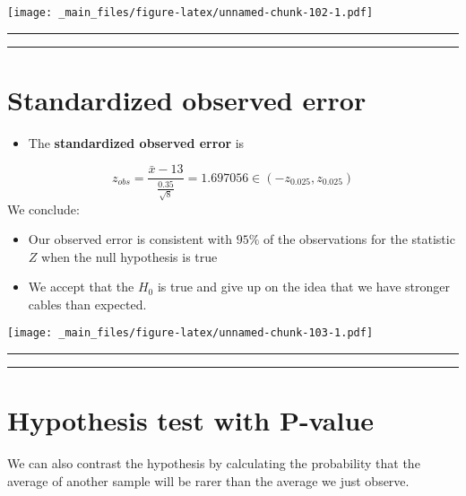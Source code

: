 \documentclass[
]{book}
\providecommand{\tightlist}{%
  \setlength{\itemsep}{0pt}\setlength{\parskip}{0pt}}
\begin{document}
\texttt{[image: \_main\_files/figure-latex/unnamed-chunk-102-1.pdf]}

\begin{center}\rule{0.5\linewidth}{0.5pt}\end{center}

\begin{center}\rule{0.5\linewidth}{0.5pt}\end{center}

\hypertarget{standardized-observed-error}{%
\section{Standardized observed error}\label{standardized-observed-error}}

\begin{itemize}
\tightlist
\item
  The \textbf{standardized observed error} is
\end{itemize}

\[z_{obs}=\frac{\bar{x}-13}{\frac{0.35}{\sqrt{8}}}=1.697056 \in (-z_{0.025}, z_{0.025})\]
We conclude:

\begin{itemize}
\item
  Our observed error is consistent with \(95\%\) of the observations for the statistic \(Z\) when the null hypothesis is true
\item
  We accept that the \(H_0\) is true and give up on the idea that we have stronger cables than expected.
\end{itemize}

\texttt{[image: \_main\_files/figure-latex/unnamed-chunk-103-1.pdf]}

\begin{center}\rule{0.5\linewidth}{0.5pt}\end{center}

\begin{center}\rule{0.5\linewidth}{0.5pt}\end{center}

\hypertarget{hypothesis-test-with-p-value}{%
\section{Hypothesis test with P-value}\label{hypothesis-test-with-p-value}}

We can also contrast the hypothesis by calculating the probability that the average of another sample will be rarer than the average we just observe.
\end{document}
